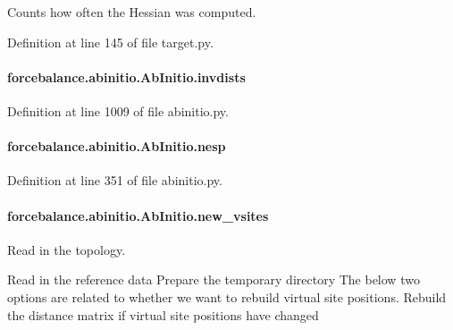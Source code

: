 Counts how often the Hessian was computed. 



Definition at line 145 of file target.\-py.

\hypertarget{classforcebalance_1_1abinitio_1_1AbInitio_aa01ee600ba0f429ffc81135af9d8109b}{
\paragraph[{invdists}]{\setlength{\rightskip}{0pt plus 5cm}forcebalance.\-abinitio.\-Ab\-Initio.\-invdists}}\label{classforcebalance_1_1abinitio_1_1AbInitio_aa01ee600ba0f429ffc81135af9d8109b}


Definition at line 1009 of file abinitio.\-py.

\hypertarget{classforcebalance_1_1abinitio_1_1AbInitio_ac258ad6180275ba2ffe5f68d1217e4ac}{
\paragraph[{nesp}]{\setlength{\rightskip}{0pt plus 5cm}forcebalance.\-abinitio.\-Ab\-Initio.\-nesp}}\label{classforcebalance_1_1abinitio_1_1AbInitio_ac258ad6180275ba2ffe5f68d1217e4ac}


Definition at line 351 of file abinitio.\-py.

\hypertarget{classforcebalance_1_1abinitio_1_1AbInitio_a64f1aeadac4d7b09424c20b83e5ad5af}{
\paragraph[{new\-\_\-vsites}]{\setlength{\rightskip}{0pt plus 5cm}forcebalance.\-abinitio.\-Ab\-Initio.\-new\-\_\-vsites}}\label{classforcebalance_1_1abinitio_1_1AbInitio_a64f1aeadac4d7b09424c20b83e5ad5af}


Read in the topology. 

Read in the reference data Prepare the temporary directory The below two options are related to whether we want to rebuild virtual site positions. Rebuild the distance matrix if virtual site positions have changed 

